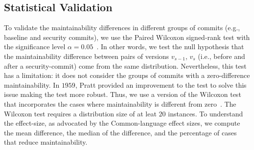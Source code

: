 \documentclass[10pt,conference]{IEEEtran}
\begin{document}
%
%
%
%

\subsection{Statistical Validation}\label{sec:statsval}
%
To validate the maintainability differences in different groups of commits
(e.g., baseline and security commits), we use the Paired Wilcoxon signed-rank
test with the significance level $\alpha = 0.05$~\cite{10.2307/3001968}. In
other words, we test the null hypothesis that the maintainability difference
between pairs of versions $v_{s-1}$, $v_s$ (i.e., before and after a
security-commit) come from the same distribution. Nevertheless, this test 
has a limitation: it does not consider the groups of commits with a 
zero-difference maintainability. In $1959$, Pratt provided an improvement to 
the test to solve this issue making the test more robust. Thus, we use a 
version of the Wilcoxon test that incorporates the cases where 
maintainability is different from zero~\cite{10.2307/2282543}.
The Wilcoxon test requires a distribution size of at leat $20$ instances.
To understand the effect-size, as advocated by the Common-language effect 
sizes\cite{graw:1992}, we compute the mean difference, the median of the 
difference, and the percentage of cases that reduce maintainability.
%
\end{document}
